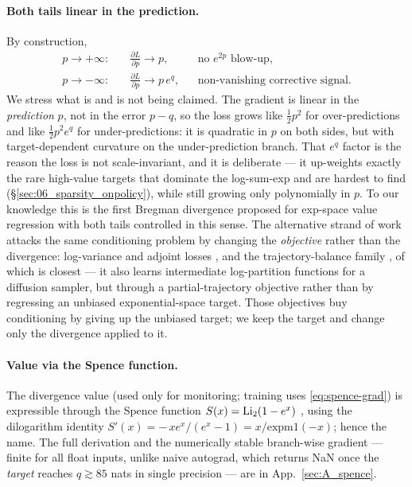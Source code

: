 \paragraph{Both tails linear in the prediction.}
By construction,
\begin{align}
  p\to+\infty:\quad & \frac{\partial L}{\partial p}\to p,
    &&\text{no $e^{2p}$ blow-up,}\\
  p\to-\infty:\quad & \frac{\partial L}{\partial p}\to p\,e^{q},
    &&\text{non-vanishing corrective signal.}
\end{align}
We stress what is and is not being claimed. The gradient is linear in the
\emph{prediction} $p$, not in the error $p-q$, so the loss grows like
$\tfrac12 p^{2}$ for over-predictions and like $\tfrac12 p^{2}e^{q}$ for
under-predictions: it is quadratic in $p$ on both sides, but with
target-dependent curvature on the under-prediction branch. That $e^{q}$ factor
is the reason the loss is not scale-invariant, and it is deliberate --- it
up-weights exactly the rare high-value targets that dominate the log-sum-exp
and are hardest to find (\S\ref{sec:06_sparsity_onpolicy}), while still growing
only polynomially in $p$. To our knowledge this is the first Bregman divergence
proposed for exp-space value regression with both tails controlled in this
sense. The alternative strand of work attacks the same conditioning problem by
changing the \emph{objective} rather than the divergence: log-variance and
adjoint losses \citep{nusken2021logvariance,richter2020vargrad,domingoenrich2024adjoint},
and the trajectory-balance family
\citep{malkin2022trajectory,madan2023subtb,venkatraman2024rtb}, of which
\citet{zhang2024dgfs} is closest --- it also learns intermediate
log-partition functions for a diffusion sampler, but through a partial-trajectory
objective rather than by regressing an unbiased exponential-space target. Those
objectives buy conditioning by giving up the unbiased target; we keep the
target and change only the divergence applied to it.

\paragraph{Value via the Spence function.}
The divergence value (used only for monitoring; training uses
\eqref{eq:spence-grad}) is expressible through the Spence function
$S(x)=\mathrm{Li}_2(1-e^{x})$ \citep{lewin1981dilogarithm}, using the dilogarithm identity
$S'(x)=-\,x e^{x}/(e^{x}-1)=x/\mathrm{expm1}(-x)$; hence the name. The full
derivation and the numerically stable branch-wise gradient --- finite for all
float inputs, unlike naive autograd, which returns NaN once the \emph{target}
reaches $q\gtrsim85$ nats in single precision --- are in App.~\ref{sec:A_spence}.

